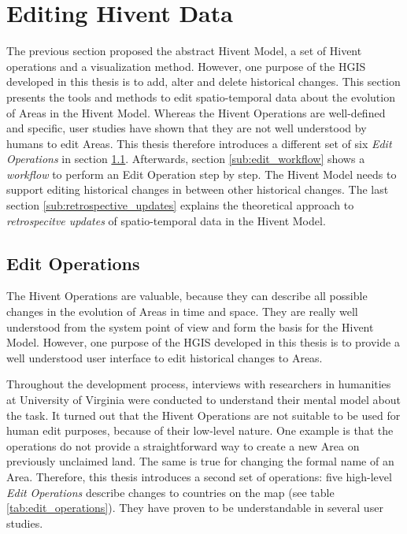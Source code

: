 
\section{Editing Hivent Data} %
\label{sec:editing_hivent_data}

The previous section proposed the abstract Hivent Model, a set of Hivent operations and a visualization method. However, one purpose of the HGIS developed in this thesis is to add, alter and delete historical changes. This section presents the tools and methods to edit spatio-temporal data about the evolution of Areas in the Hivent Model. Whereas the Hivent Operations are well-defined and specific, user studies have shown that they are not well understood by humans to edit Areas. This thesis therefore introduces a different set of six \emph{Edit Operations} in section \ref{sub:edit_operations}. Afterwards, section \ref{sub:edit_workflow} shows a \emph{workflow} to perform an Edit Operation step by step. The Hivent Model needs to support editing historical changes in between other historical changes. The last section \ref{sub:retrospective_updates} explains the theoretical approach to \emph{retrospecitve updates} of spatio-temporal data in the Hivent Model.


\subsection{Edit Operations} %
\label{sub:edit_operations}

The Hivent Operations are valuable, because they can describe all possible changes in the evolution of Areas in time and space. They are really well understood from the system point of view and form the basis for the Hivent Model. However, one purpose of the HGIS developed in this thesis is to provide a well understood user interface to edit historical changes to Areas.

Throughout the development process, interviews with researchers in humanities at University of Virginia were conducted to understand their mental model about the task. It turned out that the Hivent Operations are not suitable to be used for human edit purposes, because of their low-level nature. One example is that the operations do not provide a straightforward way to create a new Area on previously unclaimed land. The same is true for changing the formal name of an Area. Therefore, this thesis introduces a second set of operations: five high-level \emph{Edit Operations} describe changes to countries on the map (see table \ref{tab:edit_operations}). They have proven to be understandable in several user studies.


